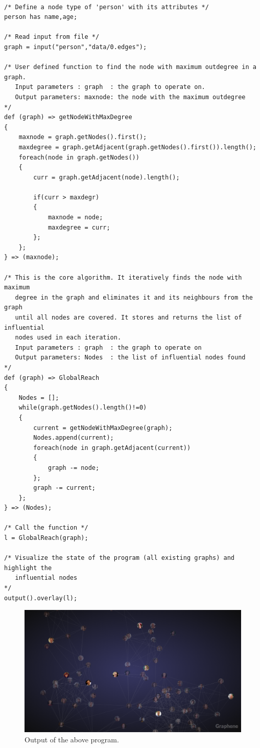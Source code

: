 \documentclass[a4paper]{article}
\begin{document}
\begin{verbatim}

/* Define a node type of 'person' with its attributes */
person has name,age;

/* Read input from file */
graph = input("person","data/0.edges");

/* User defined function to find the node with maximum outdegree in a graph.
   Input parameters : graph  : the graph to operate on.
   Output parameters: maxnode: the node with the maximum outdegree
*/
def (graph) => getNodeWithMaxDegree
{
    maxnode = graph.getNodes().first();
    maxdegree = graph.getAdjacent(graph.getNodes().first()).length();
    foreach(node in graph.getNodes())
    {
        curr = graph.getAdjacent(node).length();

        if(curr > maxdegr)
        {
            maxnode = node;
            maxdegree = curr;
        };
    };
} => (maxnode);

/* This is the core algorithm. It iteratively finds the node with maximum
   degree in the graph and eliminates it and its neighbours from the graph
   until all nodes are covered. It stores and returns the list of influential
   nodes used in each iteration.
   Input parameters : graph  : the graph to operate on
   Output parameters: Nodes  : the list of influential nodes found
*/
def (graph) => GlobalReach
{
    Nodes = [];
    while(graph.getNodes().length()!=0)
    {
        current = getNodeWithMaxDegree(graph);
        Nodes.append(current);
        foreach(node in graph.getAdjacent(current))
        {
            graph -= node;
        };
        graph -= current;
    };
} => (Nodes);

/* Call the function */
l = GlobalReach(graph);

/* Visualize the state of the program (all existing graphs) and highlight the
   influential nodes
*/
output().overlay(l);

\end{verbatim}

\begin{figure}[ht]
\centering
\includegraphics[width=1.0\textwidth]{screenshot.png}
\caption{Output of the above program.}
\end{figure}
\end{document}
